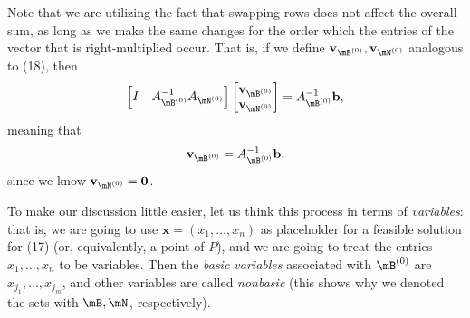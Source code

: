 \documentclass{article}
\renewcommand{\vec}{\mathbf}
\begin{document}
Note that we are utilizing the fact that swapping rows does not affect the overall sum, as long as we make the same changes for the order which the entries of the vector that is right-multiplied occur. That is, if we define $\vec{v}_{\mB^{\left( 0 \right) }}, \vec{v}_{\mN^{\left( 0 \right) }}$ analogous to (18), then
\begin{equation*}
    \begin{bmatrix} I & A_{\mB^{\left( 0 \right) }}^{-1} A_{\mN^{\left( 0 \right) }} \end{bmatrix} \begin{bmatrix} \vec{v}_{\mB^{\left( 0 \right) }}\\\vec{v}_{\mN^{\left( 0 \right) }} \end{bmatrix} = A_{\mB^{\left( 0 \right) }}^{-1} \vec{b},
\end{equation*}
meaning that
\begin{equation*}
    \vec{v}_{\mB^{\left( 0 \right) }} = A_{\mB^{\left( 0 \right) }}^{-1} \vec{b},
\end{equation*}
since we know $\vec{v}_{\mN^{\left( 0 \right) }}=\vec{0}$.

To make our discussion little easier, let us think this process in terms of \textit{variables}: that is, we are going to use $\vec{x}=\left( x_1,\ldots,x_n \right)$ as placeholder for a feasible solution for (17) (or, equivalently, a point of $P$), and we are going to treat the entries $x_1,\ldots,x_n$ to be variables. Then the \textit{basic variables} associated with $\mB^{\left( 0 \right) }$ are $x_{j_1},\ldots,x_{j_m}$, and other variables are called \textit{nonbasic} (this shows why we denoted the sets with $\mB,\mN$, respectively). 
\end{document}
